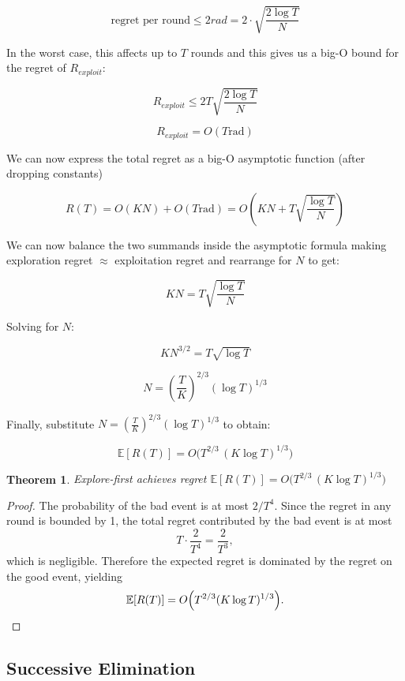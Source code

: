 \documentclass[12pt]{article}
\newtheorem{theorem}{Theorem}[section]
\begin{document}
\[
\text{regret per round} \leq 2rad = 2 \cdot \sqrt{\frac{2\log T}{N}}
\]

\noindent In the worst case, this affects up to $T$ rounds and this gives us a big-O bound for the regret of $R_{exploit}$:

\[
R_{exploit} \leq 2T \sqrt{\frac{2\log T}{N}} 
\]

\[
R_{exploit} = O(T \mathrm{rad})  
\]

\noindent We can now express the total regret as a big-O asymptotic function (after dropping constants)

\[
R(T) = O(KN) + O(T \mathrm{rad})  = O(KN + T \sqrt{\frac{\log T}{N}}) 
\]

\noindent We can now balance the two summands inside the asymptotic formula making exploration regret $\approx$ exploitation regret and rearrange for $N$ to get:

\[
KN = T \sqrt{\frac{\log T}{N}}
\]

\noindent Solving for $N$:

\[
K N^{3/2} = T \sqrt{\log T}
\]

\[
N = \left(\frac{T}{K}\right)^{2/3} (\log T)^{1/3}
\]


\noindent Finally, substitute $N = \left(\frac{T}{K}\right)^{2/3} (\log T)^{1/3}$ to obtain:

\begin{equation}
\mathbb{E}[R(T)] = O\Big( T^{2/3} \,(K \log T)^{1/3} \Big) 
\tag{3.2}
\label{eq:regret-unf-exp}
\end{equation}

\vspace{5mm}


\begin{theorem}
Explore-first achieves regret $\mathbb{E}[R(T)] = O\Big( T^{2/3} \,(K \log T)^{1/3} \Big)$\
\end{theorem}
\begin{proof}
The probability of the bad event is at most $2/T^4$. Since the regret in any round is bounded by 1, the total regret contributed by the bad event is at most
\[
T \cdot \frac{2}{T^4} = \frac{2}{T^3},
\]
which is negligible. Therefore the expected regret is dominated by the regret on the good event, yielding
\[
\mathbb{E}[R(T)]
= O\Bigl(T^{2/3}(K\log T)^{1/3}\Bigr).
\]
\end{proof}

\newpage


\subsection{Successive Elimination}
\end{document}

